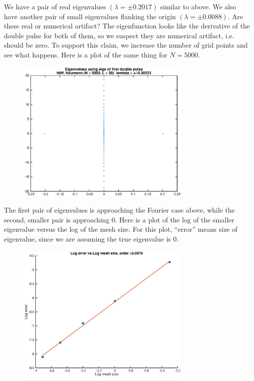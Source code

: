 \documentclass[12pt]{article}
\begin{document}
We have a pair of real eigenvalues $(\lambda = \pm 0.2017)$ similar to above. We also have another pair of small eigenvalues flanking the origin $(\lambda = \pm 0.0088)$. Are these real or numerical artifact? The eigenfunction looks like the derivative of the double pulse for both of them, so we suspect they are numerical artifact, i.e. should be zero. To support this claim, we increase the number of grid points and see what happens. Here is a plot of the same thing for $N = 5000$.

\begin{figure}[H]
\includegraphics[width=8.5cm]{d1fdiffeig5000.eps}
\end{figure}

The first pair of eigenvalues is approaching the Fourier case above, while the second, smaller pair is approaching 0. Here is a plot of the log of the smaller eigenvalue versus the log of the mesh size. For this plot, ``error'' means size of eigenvalue, since we are assuming the true eigenvalue is 0.

\begin{figure}[H]
\includegraphics[width=8.5cm]{smalleigerror.eps}
\end{figure}
\end{document}
